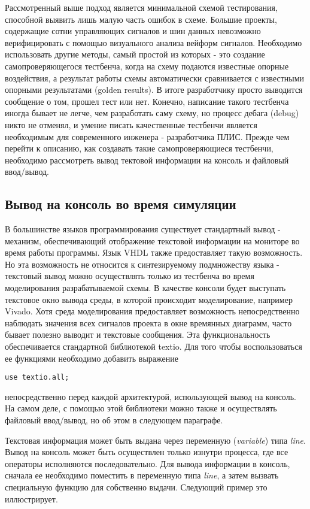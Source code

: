 Рассмотренный выше подход является минимальной схемой тестирования, способной выявить лишь малую часть ошибок в схеме. Большие проекты, содержащие сотни управляющих сигналов и шин данных невозможно верифицировать с помощью визуального анализа вейформ сигналов. Необходимо использовать другие методы, самый простой из которых - это создание самопроверяющегося тестбенча, когда на схему подаются известные опорные воздействия, а результат работы схемы автоматически сравнивается с известными опорными результатами (golden results). В итоге разработчику просто выводится сообщение о том, прошел тест или нет. Конечно, написание такого тестбенча иногда бывает не легче, чем разработать саму схему, но процесс дебага (debug) никто не отменял, и умение писать качественные тестбенчи является необходимым для современного инженера - разработчика ПЛИС. Прежде чем перейти к описанию, как создавать такие самопроверяющиеся тестбенчи, необходимо рассмотреть вывод тектовой информации на консоль и файловый ввод/вывод.

\subsection{Вывод на консоль во время симуляции}

В большинстве языков программирования существует стандартный вывод - механизм, обеспечивающий отображение текстовой информации на мониторе во время работы программы. Язык VHDL также предоставляет такую возможность. Но эта возможность не относится к синтезируемому подмножеству языка - текстовый вывод можно осуществлять только из тестбенча во время моделирования разрабатываемой схемы. В качестве консоли будет выступать текстовое окно вывода среды, в которой происходит моделирование, например Vivado. Хотя среда моделирования предоставляет возможность непосредственно наблюдать значения всех сигналов проекта в окне времянных диаграмм, часто бывает полезно выводит и текстовые сообщения. Эта функциональность обеспечивается стандартной библиотекой textio. Для того чтобы воспользоваться ее функциями необходимо добавить выражение

\begin{lstlisting}
use textio.all;
\end{lstlisting}
непосредственно перед каждой архитектурой, использующей вывод на консоль. На самом деле, с помощью этой библиотеки можно также и осуществлять файловый ввод/вывод, но об этом в следующем параграфе.

Текстовая информация может быть выдана через переменную (\emph{variable}) типа \emph{line}. Вывод на консоль может быть осуществлен только изнутри процесса, где все операторы исполняются последовательно. Для вывода информации в консоль, сначала ее необходимо поместить в переменную типа \emph{line}, а затем вызвать специальную функцию для собственно выдачи. Следующий пример это иллюстрирует.

